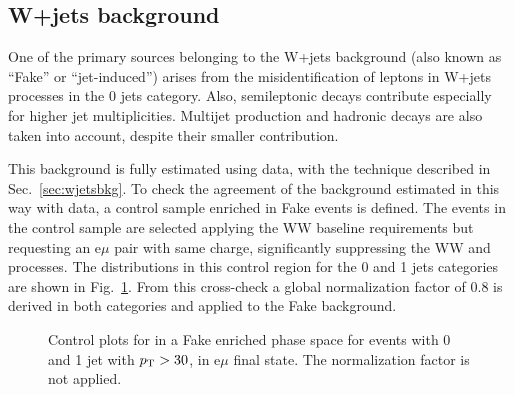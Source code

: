 \subsection{W+jets background}

One of the primary sources belonging to the W+jets background (also known as ``Fake'' or ``jet-induced'') arises from the misidentification of leptons in W+jets processes in the 0 jets category. Also, semileptonic \ttbar decays contribute especially for higher jet multiplicities. Multijet production and hadronic \ttbar decays are also taken into account, despite their smaller contribution.

This background is fully estimated using data, with the technique described in Sec.~\ref{sec:wjetsbkg}. To check the agreement of the background estimated in this way with data, a control sample enriched in Fake events is defined. The events in the control sample are selected applying the WW baseline requirements but requesting an e$\mu$ pair with same charge, significantly suppressing the WW and \ttbar processes. The \mll distributions in this control region for the 0 and 1 jets categories are shown in Fig.~\ref{fig:13TeVsamesign}. From this cross-check a global normalization factor of 0.8 is derived in both categories and applied to the Fake background.

\begin{figure}[htb]
\centering
    \caption{
         Control plots for \mll in a Fake enriched phase space for events with 0 and 1 jet with $p_\mathrm{T} > 30$\GeV, in e$\mu$ final state. The normalization factor is not applied.
         }\label{fig:13TeVsamesign}
\end{figure}

